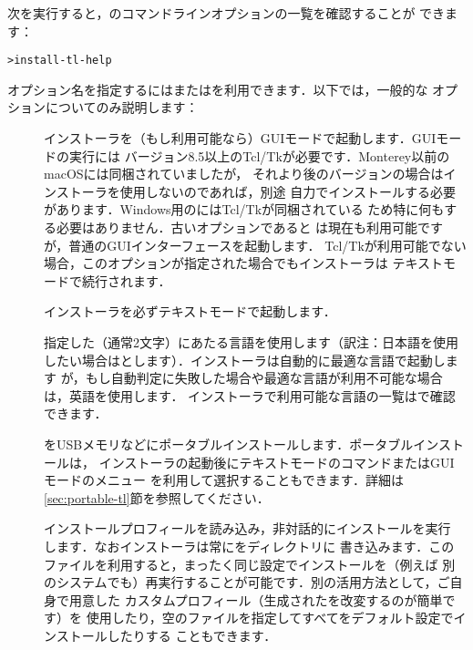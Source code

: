 \documentclass[uplatex,dvipdfmx,tombow]{jsarticle}
\begin{document}
次を実行すると，のコマンドラインオプションの一覧を確認することが
できます：
%
\begin{alltt}
> install-tl -help
\end{alltt}
%
オプション名を指定するには\sopt{}または\lopt{}を利用できます．以下では，一般的な
オプションについてのみ説明します：
%
\begin{description}
\item[]
インストーラを（もし利用可能なら）GUIモードで起動します．GUIモードの実行には
バージョン8.5以上のTcl/Tkが必要です．Monterey以前のmacOSには同梱されていましたが，
それより後のバージョンの場合は\MacTeX インストーラを使用しないのであれば，別途
自力でインストールする必要があります．Windows用の\TL にはTcl/Tkが同梱されている
ため特に何もする必要はありません．古いオプションであると
は現在も利用可能ですが，普通のGUIインターフェースを起動します．
Tcl/Tkが利用可能でない場合，このオプションが指定された場合でもインストーラは
テキストモードで続行されます．

\item[]
インストーラを必ずテキストモードで起動します．

\item[]
指定した（通常2文字）にあたる言語を使用します（訳注：日本語を使用
したい場合はとします）．インストーラは自動的に最適な言語で起動します
が，もし自動判定に失敗した場合や最適な言語が利用不可能な場合は，英語を使用します．
インストーラで利用可能な言語の一覧はで確認できます．

\item[]
\TL をUSBメモリなどにポータブルインストールします．ポータブルインストールは，
インストーラの起動後にテキストモードのコマンドまたはGUIモードのメニュー
を利用して選択することもできます．詳細は\ref{sec:portable-tl}節を参照してください．

\item[]
インストールプロフィールを読み込み，非対話的にインストールを実行
します．なおインストーラは常にをディレクトリに
書き込みます．このファイルを利用すると，まったく同じ設定でインストールを（例えば
別のシステムでも）再実行することが可能です．別の活用方法として，ご自身で用意した
カスタムプロフィール（生成されたを改変するのが簡単です）を
使用したり，空のファイルを指定してすべてをデフォルト設定でインストールしたりする
こともできます．


\end{description}
\end{document}
